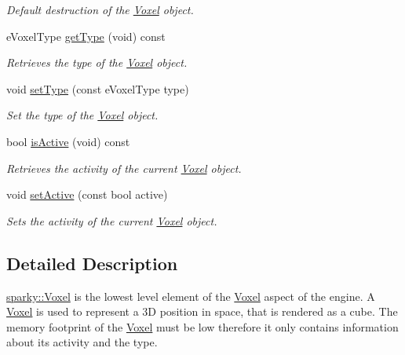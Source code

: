 \begin{DoxyCompactItemize}
\begin{DoxyCompactList}\small\item\em Default destruction of the \hyperlink{classsparky_1_1_voxel}{Voxel} object. \end{DoxyCompactList}\item 
e\+Voxel\+Type \hyperlink{classsparky_1_1_voxel_a8a57d5735e3fed7eab22464926e2757c}{get\+Type} (void) const 
\begin{DoxyCompactList}\small\item\em Retrieves the type of the \hyperlink{classsparky_1_1_voxel}{Voxel} object. \end{DoxyCompactList}\item 
void \hyperlink{classsparky_1_1_voxel_a76dc4f65854155bdf2a16c56c3432505}{set\+Type} (const e\+Voxel\+Type type)
\begin{DoxyCompactList}\small\item\em Set the type of the \hyperlink{classsparky_1_1_voxel}{Voxel} object. \end{DoxyCompactList}\item 
bool \hyperlink{classsparky_1_1_voxel_a647cc608eb5b57a3e64744752eb009fa}{is\+Active} (void) const 
\begin{DoxyCompactList}\small\item\em Retrieves the activity of the current \hyperlink{classsparky_1_1_voxel}{Voxel} object. \end{DoxyCompactList}\item 
void \hyperlink{classsparky_1_1_voxel_a358a07e19e2b9a5ad0f61b45b5c3cf12}{set\+Active} (const bool active)
\begin{DoxyCompactList}\small\item\em Sets the activity of the current \hyperlink{classsparky_1_1_voxel}{Voxel} object. \end{DoxyCompactList}\end{DoxyCompactItemize}


\subsection{Detailed Description}
\hyperlink{classsparky_1_1_voxel}{sparky\+::\+Voxel} is the lowest level element of the \hyperlink{classsparky_1_1_voxel}{Voxel} aspect of the engine. A \hyperlink{classsparky_1_1_voxel}{Voxel} is used to represent a 3D position in space, that is rendered as a cube. The memory footprint of the \hyperlink{classsparky_1_1_voxel}{Voxel} must be low therefore it only contains information about it\textquotesingle{}s activity and the type.

